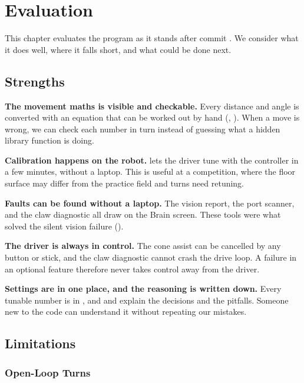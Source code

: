 \chapter{Evaluation}
\label{ch:evaluation}

This chapter evaluates the program as it stands after commit . We
consider what it does well, where it falls short, and what could be done next.

\section{Strengths}
\label{sec:strengths}

\textbf{The movement maths is visible and checkable.} Every distance and angle is
converted with an equation that can be worked out by hand (,
). When a move is wrong, we can check each number in turn instead of
guessing what a hidden library function is doing.

\textbf{Calibration happens on the robot.}  lets the driver tune
 with the controller in a few minutes, without a laptop. This is
useful at a competition, where the floor surface may differ from the practice
field and turns need retuning.

\textbf{Faults can be found without a laptop.} The vision report, the port scanner,
and the claw diagnostic all draw on the Brain screen. These tools were what solved
the silent vision failure ().

\textbf{The driver is always in control.} The cone assist can be cancelled by any
button or stick, and the claw diagnostic cannot crash the drive loop. A failure in
an optional feature therefore never takes control away from the driver.

\textbf{Settings are in one place, and the reasoning is written down.} Every
tunable number is in , and  and 
explain the decisions and the pitfalls. Someone new to the code can understand it
without repeating our mistakes.

\section{Limitations}
\label{sec:limitations}

\subsection{Open-Loop Turns}

